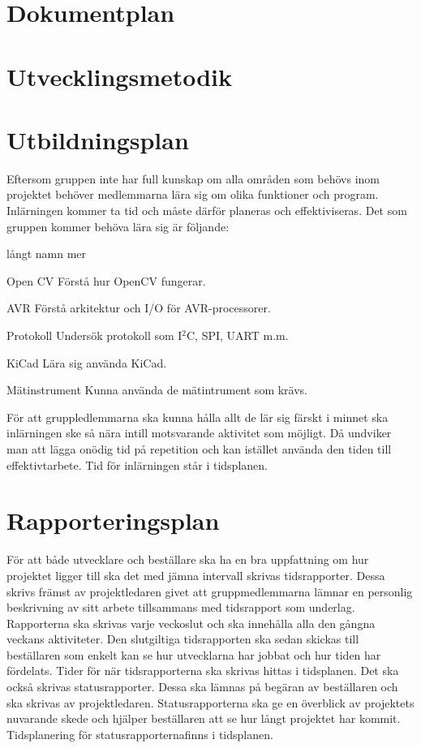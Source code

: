 \documentclass[projektplan/plan.tex]{subfiles}
\begin{document}
\section{Dokumentplan}

\section{Utvecklingsmetodik} 


\section{Utbildningsplan}
Eftersom gruppen inte har full kunskap om alla områden som behövs inom projektet behöver medlemmarna lära sig om olika funktioner och program. Inlärningen kommer ta tid och måste därför planeras och effektiviseras. Det som gruppen kommer behöva lära sig är följande:

\begin{labeling}{långt namn mer}
    \item[Open CV] Förstå hur OpenCV fungerar.
    \item[AVR] Förstå arkitektur och I/O för
    AVR-processorer.
    \item[Protokoll] Undersök protokoll som
    I$^2$C, SPI, UART m.m.
    \item[KiCad] Lära sig använda KiCad.
    \item[Mätinstrument] Kunna använda de mätintrument som krävs.
\end{labeling}

För att gruppledlemmarna ska kunna hålla allt de lär sig färskt i minnet ska inlärningen ske så nära intill motsvarande aktivitet som möjligt. Då undviker man att lägga onödig tid på repetition och kan istället använda den tiden till effektivtarbete. Tid för inlärningen står i tidsplanen.

\section{Rapporteringsplan}
För att både utvecklare och beställare ska ha en bra uppfattning om hur projektet ligger till ska det med jämna intervall skrivas tidsrapporter. Dessa skrivs främst av projektledaren givet att gruppmedlemmarna lämnar en personlig beskrivning av sitt arbete tillsammans med tidsrapport som underlag. Rapporterna ska skrivas varje veckoslut och ska innehålla alla den gångna veckans aktiviteter. Den slutgiltiga tidsrapporten ska sedan skickas till beställaren som enkelt kan se hur utvecklarna har jobbat och hur tiden har fördelats. Tider för när tidsrapporterna ska skrivas hittas i tidsplanen.
Det ska också skrivas statusrapporter. Dessa ska lämnas på begäran av beställaren och ska skrivas av projektledaren. Statusrapporterna ska ge en överblick av projektets nuvarande skede och hjälper beställaren att se hur långt projektet har kommit. Tidsplanering för statusrapporternafinns i tidsplanen.
\end{document}
